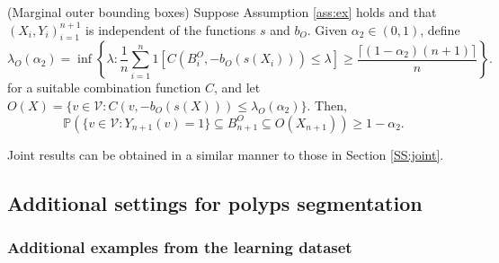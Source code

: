 \begin{corollary}\label{thm:boxgenouter}
	(Marginal outer bounding boxes)
	Suppose Assumption \ref{ass:ex} holds and that $(X_i, Y_i)_{i = 1}^{n+1}$ is independent of the functions $s$ and $b_O$. Given $\alpha_2 \in (0,1)$, define 
	\begin{equation}
		\lambda_O({\alpha_2})= \inf\left\lbrace \lambda: \frac{1}{n} \sum_{i = 1}^n 1\left[ C(B^O_i, -b_O(s(X_i))) \leq \lambda \right] \geq  \frac{\lceil (1-\alpha_2)(n+1) \rceil}{n} \right\rbrace.
	\end{equation}
	for a suitable combination function $C$, and let $O(X) = \lbrace v \in \mathcal{V}: C(v, -b_O(s(X))) \leq \lambda_O(\alpha_2)  \rbrace $. Then,
	\begin{equation*}\label{eq:probstat}
		\mathbb{P}\left( \lbrace v\in \mathcal{V}: Y_{n+1}(v) = 1 \rbrace \subseteq B^O_{n+1} \subseteq O(X_{n+1}) \right) \geq 1 - \alpha_2.
	\end{equation*}
\end{corollary}
Joint results can be obtained in a similar manner to those in Section \ref{SS:joint}.

\newpage
\subsection{Additional settings for polyps segmentation}
\subsubsection{Additional examples from the learning dataset}

